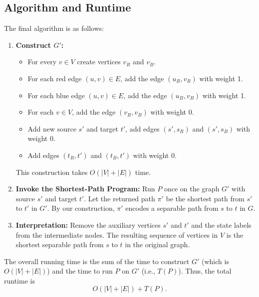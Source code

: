 \documentclass[11pt]{article}
\begin{document}
    \subsection*{Algorithm and Runtime}
    The final algorithm is as follows:
    \begin{enumerate}
      \item \textbf{Construct \(G'\):}  
        \begin{itemize}
          \item For every \(v\in V\) create vertices \(v_R\) and \(v_B\).
          \item For each red edge \((u,v) \in E\), add the edge \((u_R,v_R)\) with weight 1.
          \item For each blue edge \((u,v) \in E\), add the edge \((u_B,v_B)\) with weight 1.
          \item For each \(v\in V\), add the edge \((v_R,v_B)\) with weight 0.
          \item Add new source \(s'\) and target \(t'\), add edges \((s',s_R)\) and \((s',s_B)\) with weight 0.
          \item Add edges \((t_R,t')\) and \((t_B,t')\) with weight 0.
        \end{itemize}
        This construction takes \(O(|V|+|E|)\) time.
        
      \item \textbf{Invoke the Shortest-Path Program:}  
        Run \(P\) once on the graph \(G'\) with source \(s'\) and target \(t'\). Let the returned path \( \pi' \) be the shortest path from \(s'\) to \(t'\) in \(G'\). By our construction, \(\pi'\) encodes a separable path from \(s\) to \(t\) in \(G\).
    
      \item \textbf{Interpretation:}  
        Remove the auxiliary vertices \(s'\) and \(t'\) and the state labels from the intermediate nodes. The resulting sequence of vertices in \(V\) is the shortest separable path from \(s\) to \(t\) in the original graph.
    \end{enumerate}
    
    The overall running time is the sum of the time to construct \(G'\) (which is \(O(|V|+|E|)\)) and the time to run \(P\) on \(G'\) (i.e., \(T(P)\)). Thus, the total runtime is
    \[
      O(|V|+|E|) + T(P).
    \]

    \newpage
    
\end{document}
